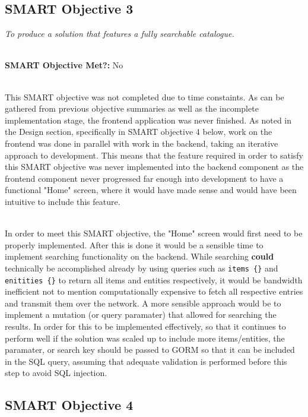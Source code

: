 \documentclass[../main.tex]{subfiles}
\begin{document}
\subsection{SMART Objective 3}

\textit{To produce a solution that features a fully searchable catalogue.}

\noindent \\ \textbf{SMART Objective Met?:} No

\noindent \\ This SMART objective was not completed due to time constaints.
As can be gathered from previous objective summaries as well as the incomplete
implementation stage, the frontend application was never finished.
As noted in the Design section, specifically in SMART objective 4 below,
work on the frontend was done in parallel with work in the backend, taking
an iterative approach to development. This means that the feature required in order
to satisfy this SMART objective was never implemented into the backend component
as the frontend component never progressed far enough into development to have a functional
"Home" screen, where it would have made sense and would have been intuitive to include
this feature.

\noindent \\ In order to meet this SMART objective, the "Home" screen would first need to be
properly implemented. After this is done it would be a sensible time to implement searching
functionality on the backend. While searching \textbf{could} technically be accomplished
already by using queries such as \lstinline[language=graphql]|items {}| and \lstinline[language=graphql]|enitities {}| to return
all items and entities respectively, it would be bandwidth inefficient not to mention computationally
expensive to fetch all respective entries and transmit them over the network. A more sensible
approach would be to implement a mutation (or query paramater) that allowed for searching
the results. In order for this to be implemented effectively, so that it continues to perform
well if the solution was scaled up to include more items/entities, the paramater, or search key
should be passed to GORM so that it can be included in the SQL query, assuming that adequate
validation is performed before this step to avoid SQL injection.

\subsection{SMART Objective 4}
\end{document}
